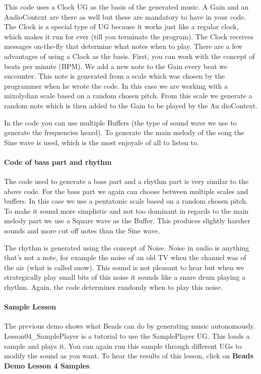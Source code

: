 \documentclass[12pt]{article}
\begin{document}
This code uses a Clock UG as the basis of the generated music. A Gain and an AudioContext are there as well but these are mandatory to have in your code. The Clock is a special type of UG because it works just like a regular clock, which makes it run for ever (till you terminate the program). The Clock receives messages on-the-fly that determine what notes when to play. There are a few advantages of using a Clock as the basis. First, you can work with the concept of beats per minute (BPM). We add a new note to the Gain every beat we encounter. This note is generated from a scale which was chosen by the programmer when he wrote the code. In this case we are working with a mixolydian scale based on a random chosen pitch. From this scale we generate a random note which is then added to the Gain to be played by the Au	dioContext.

In the code you can use multiple Buffers (the type of sound wave we use to generate the frequencies heard). To generate the main melody of the song the Sine wave is used, which is the most enjoyale of all to listen to.

\paragraph{Code of bass part and rhythm} 

The code used to generate a bass part and a rhythm part is very similar to the above code. For the bass part we again can choose between multiple scales and buffers. In this case we use a pentatonic scale based on a random chosen pitch. To make it sound more simplistic and not too dominant in regards to the main melody part we use a Square wave as the Buffer. This produces slightly harsher sounds and more cut off notes than the Sine wave.

The rhythm is generated using the concept of Noise. Noise in audio is anything that's not a note, for example the noise of an old TV when the channel was of the air (what is called snow). This sound is not pleasant to hear but when we strategically play small bits of this noise it sounds like a snare drum playing a rhythm. Again, the code determines randomly when to play this noise. 

\paragraph{Sample Lesson}

The previous demo shows what Beads can do by generating music autonomously. Lesson04\_SamplePlayer is a tutorial to use the SamplePlayer UG. This loads a sample and plays it. You can again run this sample through different UGs to modify the sound as you want. To hear the results of this lesson, click on \textbf{Beads Demo Lesson 4 Samples}. 
\end{document}
